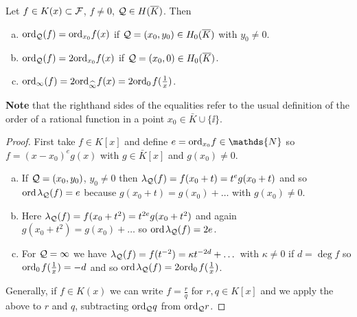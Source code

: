 \documentclass[english,11pt,a4paper]{article}
\begin{document}
\begin{lemma}\label{two}
  Let $f \in K(x) \subset \mathcal{F}$, $f \neq 0$, $\mathcal{Q} \in H(\overline K)$. Then
  \begin{enumerate}[(a)]\parskip 1mm
	  \item $\text{ord}_{\mathcal{Q}} (f) = \text{ord}_{x_0} f(x)$ if $\mathcal{Q} = (x_0,y_0) \in H_0(\overline K)$ with $y_0 \neq 0$.
	  \item $\text{ord}_{\mathcal{Q}} (f) = 2 \text{ord}_{x_0} f(x)$ if $\mathcal{Q} = (x_0,0) \in H_0(\overline K)$.
	  \item $\text{ord}_{\infty} (f) = 2 \text{ord}_{\widehat{\infty}} f(x) = 2 \text{ord}_0\hspace{0.4mm} f(\frac 1 x)$.
	\end{enumerate}\parskip 3mm
	\textbf{Note} that the righthand sides of the equalities refer to the usual definition of the order of a rational function in a point $x_0 \in \bar K \cup \{ \ii \}$.%
	\begin{proof}
		First take $f \in K[x]$ and define $e = \ordx f \in \mathds{N}$ so $f = (x-x_0)^e g(x)$ with $g \in \bar K[x]$ and $g(x_0)\neq 0$.
		\begin{enumerate}[(a)]
	  	\item If $\mathcal{Q} =(x_0,y_0)$, $y_0 \neq 0$ then $\lambda_{\mathcal{Q}} (f) = f(x_0 + t) = t^e g(x_0 + t)$ and so $\text{ord\hspace{0.4mm}} \lambda_{\mathcal{Q}} (f) = e$ because $g(x_0 + t) = g(x_0) + \dots$ with $g(x_0) \neq 0$.

	  	\item Here $\lambda_{\mathcal{Q}} (f) = f(x_0 + t^2) = t^{2e} g(x_0 + t^2)$ and again $g(x_0 + t^2) = g(x_0) + \dots$ so $\text{ord\hspace{0.4mm}} \lambda_{\mathcal{Q}} (f) = 2e$.

	  	\item For $\mathcal{Q} = \infty$ we have $\lambda_{\mathcal{Q}} (f) = f(t^{-2}) = \kappa t^{-2d}+ \dots$ with $\kappa \neq 0$ if $d = \deg f$ so $\text{ord}_0\hspace{0.4mm} f(\frac 1 x ) = -d$ and so $\text{ord\hspace{0.4mm}} \lambda_{\mathcal{Q}} (f) = 2 \text{ord}_0\hspace{0.4mm} f(\frac 1 x )$.
		\end{enumerate}
		Generally, if $f \in K(x)$ we can write $f = \frac r q$ for $r, q \in K[x]$ and we apply the above to $r$ and $q$, subtracting $\text{ord}_{\mathcal{Q}} q$ from $\text{ord}_{\mathcal{Q}} r$.%
	\end{proof}
\end{lemma}
\end{document}
